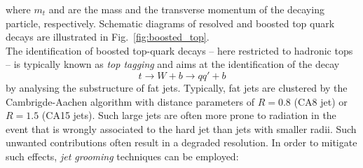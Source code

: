 where $m_t$ and \pt are the mass and the transverse momentum of the decaying particle, respectively. Schematic diagrams of resolved and boosted top quark decays are illustrated in Fig.~\ref{fig:boosted_top}. \\
The identification of boosted top-quark decays -- here restricted to hadronic tops -- is typically known as \textit{top tagging} and aims at the identification of the decay
\begin{equation}
 t \rightarrow W + b \rightarrow qq' + b 
\end{equation} 
by analysing the substructure of fat jets. Typically, fat jets are clustered by the Cambrigde-Aachen algorithm with distance parameters of $R = 0.8$ (CA8 jet) or $R = 1.5$ (CA15 jets). Such large jets are often more prone to radiation in the event that is wrongly associated to the hard jet than jets with smaller radii. Such unwanted contributions often result in a degraded resolution. In order to mitigate such effects, \textit{jet grooming} techniques can be employed:
